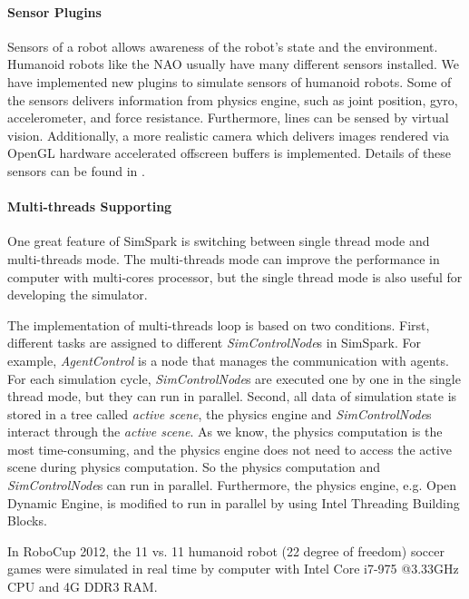 \documentclass{llncs}
\begin{document}
\paragraph{Sensor Plugins}
Sensors of a robot allows awareness of the robot's state and the environment.
Humanoid robots like the NAO usually have many different sensors installed.
We have implemented new plugins to simulate sensors of humanoid robots.
Some of the sensors delivers information from physics engine, such as joint position, gyro, accelerometer, and force resistance. Furthermore, lines can be sensed by virtual vision.
Additionally, a more realistic camera which delivers images rendered via OpenGL hardware accelerated offscreen buffers is implemented. Details of these sensors can be found in \cite{usermanual}.

\paragraph{Multi-threads Supporting}
One great feature of SimSpark is switching between single thread mode and multi-threads
mode. The multi-threads mode can improve the performance in computer with multi-cores processor, but the single thread mode is also useful for developing the simulator. 

The implementation of multi-threads loop is based on two conditions.
First, different tasks are assigned to different \textit{SimControlNode}s in SimSpark.
For example, \textit{AgentControl} is a node that manages the communication with agents.
For each simulation cycle, \textit{SimControlNode}s are executed one by one in the single thread mode, but they can run in parallel.
Second, all data of simulation state is stored in a tree called \textit{active scene},
the physics engine and \textit{SimControlNode}s interact through the \textit{active scene}.
As we know, the physics computation is the most time-consuming, and the physics engine does not need to access the active scene during physics computation.
So the physics computation and \textit{SimControlNode}s can run in parallel.
Furthermore, the physics engine, e.g. Open Dynamic Engine\cite{Smith:ODE}, is modified to run in parallel by using Intel Threading Building Blocks\cite{tbb}.

In RoboCup 2012, the 11 vs. 11 humanoid robot (22 degree of freedom) soccer games were simulated in real time by computer with Intel Core i7-975 @3.33GHz CPU and 4G DDR3 RAM. 
\end{document}
